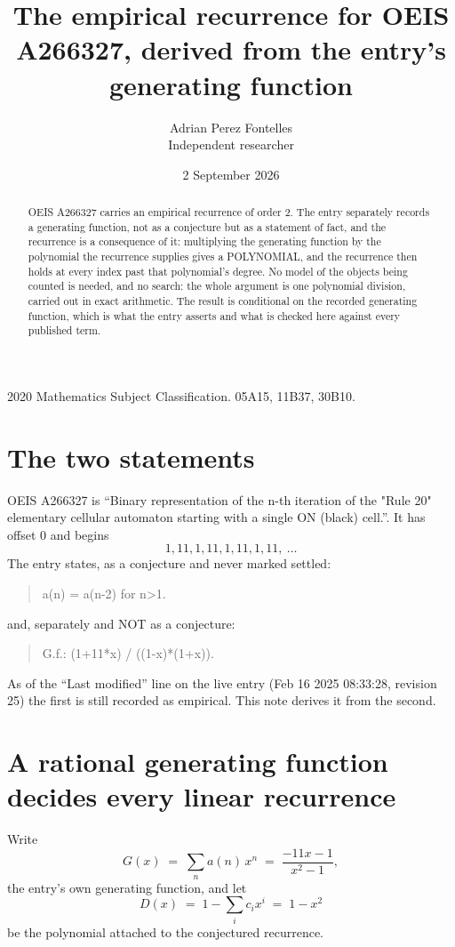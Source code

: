 \documentclass[11pt,a4paper]{article}
\title{The empirical recurrence for OEIS A266327, derived from the entry's generating function}
\author{Adrian Perez Fontelles\\ \small Independent researcher}
\date{2 September 2026}
\theoremstyle{plain}
\theoremstyle{definition}
\begin{document}
\maketitle

\begin{abstract}
OEIS A266327 carries an empirical recurrence of order $2$. The entry separately records a
generating function, not as a conjecture but as a statement of fact, and the recurrence is a
consequence of it: multiplying the generating function by the polynomial the recurrence
supplies gives a POLYNOMIAL, and the recurrence then holds at every index past that
polynomial's degree. No model of the objects being counted is needed, and no search: the
whole argument is one polynomial division, carried out in exact arithmetic. The result is
conditional on the recorded generating function, which is what the entry asserts and what is
checked here against every published term.
\end{abstract}

\noindent\small 2020 Mathematics Subject Classification. 05A15, 11B37, 30B10.\normalsize

\section{The two statements}

OEIS A266327 is ``Binary representation of the n-th iteration of the "Rule 20" elementary cellular automaton starting with a single ON (black) cell.''. It has offset $0$ and begins
\[
1, 11, 1, 11, 1, 11, 1, 11,\ \dots
\]
The entry states, as a conjecture and never marked settled:
\begin{quote}
a(n) = a(n-2) for n>1.
\end{quote}
and, separately and NOT as a conjecture:
\begin{quote}
G.f.: (1+11*x) / ((1-x)*(1+x)).
\end{quote}
As of the ``Last modified'' line on the live entry (Feb 16 2025 08:33:28, revision 25) the first is still
recorded as empirical. This note derives it from the second.

\section{A rational generating function decides every linear recurrence}

Write
\[
G(x)\;=\;\sum_{n}a(n)\,x^{n}\;=\;\frac{- 11 x - 1}{x^{2} - 1},
\]
the entry's own generating function, and let
\[
D(x)\;=\;1-\sum_i c_i x^{i}\;=\;1 - x^{2}
\]
be the polynomial attached to the conjectured recurrence.
\end{document}
